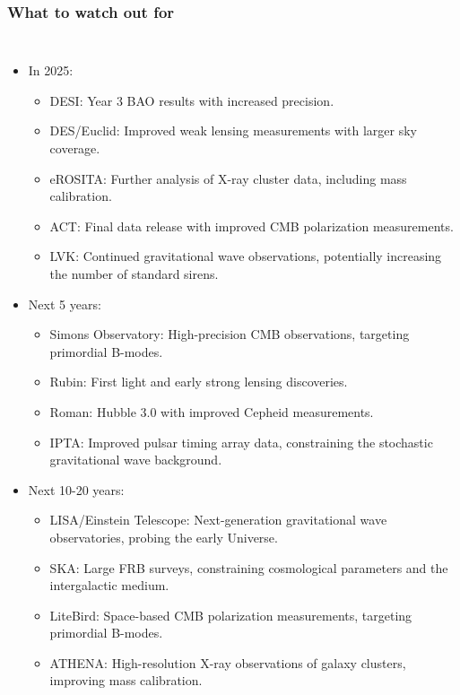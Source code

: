 \documentclass[aspectratio=169]{beamer}
\begin{document}
\begin{frame}
    \frametitle{What to watch out for}
    \begin{columns}
        \begin{itemize}
            \item In 2025:
                \begin{itemize}
                    \item DESI: Year 3 BAO results with increased precision.
                    \item DES/Euclid: Improved weak lensing measurements with larger sky coverage.
                    \item eROSITA: Further analysis of X-ray cluster data, including mass calibration.
                    \item ACT: Final data release with improved CMB polarization measurements.
                    \item LVK: Continued gravitational wave observations, potentially increasing the number of standard sirens.
                \end{itemize}
            \item Next 5 years:
                \begin{itemize}
                    \item Simons Observatory: High-precision CMB observations, targeting primordial B-modes.
                    \item Rubin: First light and early strong lensing discoveries.
                    \item Roman: Hubble 3.0 with improved Cepheid measurements.
                    \item IPTA: Improved pulsar timing array data, constraining the stochastic gravitational wave background.
                \end{itemize}
            \item Next 10-20 years:
                \begin{itemize}
                    \item LISA/Einstein Telescope: Next-generation gravitational wave observatories, probing the early Universe.
                    \item SKA: Large FRB surveys, constraining cosmological parameters and the intergalactic medium.
                    \item LiteBird: Space-based CMB polarization measurements, targeting primordial B-modes.
                    \item ATHENA: High-resolution X-ray observations of galaxy clusters, improving mass calibration.

\end{itemize}
\end{itemize}
\end{columns}
\end{frame}
\end{document}

